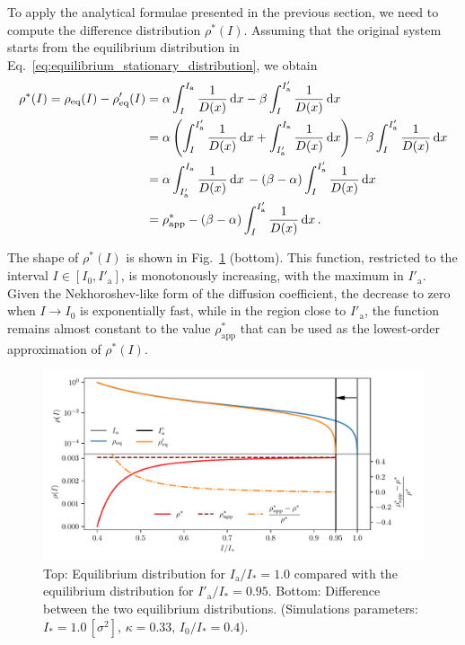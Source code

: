 To apply the analytical formulae presented in the previous section, we need to compute the difference distribution $\rho^\ast(I)$. Assuming that the original system starts from the equilibrium distribution in Eq.~\eqref{eq:equilibrium_stationary_distribution}, we obtain 
\begin{align}
    \rho^\ast(I) = \rho_\text{eq}(I) - \rho'_\text{eq}(I) 
    &= \alpha \int_I^{I_\mathrm{a}} \frac{1}{D(x)}\,\mathrm{d}x - \beta \int_I^{I'_\mathrm{a}} \frac{1}{D(x)}\,\mathrm{d}x \notag \\
    &= \alpha \left( 
          \int_{I}^{I'_\mathrm{a}} \frac{1}{D(x)}\,\mathrm{d}x 
        + \int_{I'_\mathrm{a}}^{I_\mathrm{a}} \frac{1}{D(x)}\,\mathrm{d}x \right) - \beta \int_I^{I'_\mathrm{a}} \frac{1}{D(x)}\,\mathrm{d}x \notag \\
    &=  \alpha \int_{I'_\mathrm{a}}^{I_\mathrm{a}} \frac{1}{D(x)}\,\mathrm{d}x \, - (\beta - \alpha) \int_{I}^{I'_\mathrm{a}} \frac{1}{D(x)}\,\mathrm{d}x \notag \\
    &=  \rho^\ast_\text{app} - (\beta - \alpha) \int_{I}^{I'_\mathrm{a}} \frac{1}{D(x)}\,\mathrm{d}x \, .
    \label{eq:inward_difference}
\end{align}

The shape of $\rho^\ast(I)$ is shown in Fig.~\ref{fig:4} (bottom). This function, restricted to the interval $I \in [I_0, I'_\mathrm{a}]$, is monotonously increasing, with the maximum in $I'_\mathrm{a}$. Given the  Nekhoroshev-like form of the diffusion coefficient, the decrease to zero when $I \to I_0$ is exponentially fast, while in the region close to $I'_\mathrm{a}$, the function remains almost constant to the value  $\rho^\ast_\text{app}$ that can be used as the lowest-order approximation of $\rho^\ast(I)$.

\begin{figure}[htp]
    \centering
    \includegraphics[width=\textwidth]{4_probing_the_diffusive_behavior/figs/final/difference_backwards_s.pdf}
    \caption{Top: Equilibrium distribution for $I_\mathrm{a}/I_\ast = 1.0$ compared with the  equilibrium distribution for $I'_\mathrm{a}/I_\ast = 0.95$. Bottom: Difference between the two equilibrium distributions. (Simulations parameters: $I_\ast = 1.0\,[\sigma^2],\, \kappa = 0.33,\, I_0/I_\ast = 0.4$).}
    \label{fig:4}
\end{figure}

